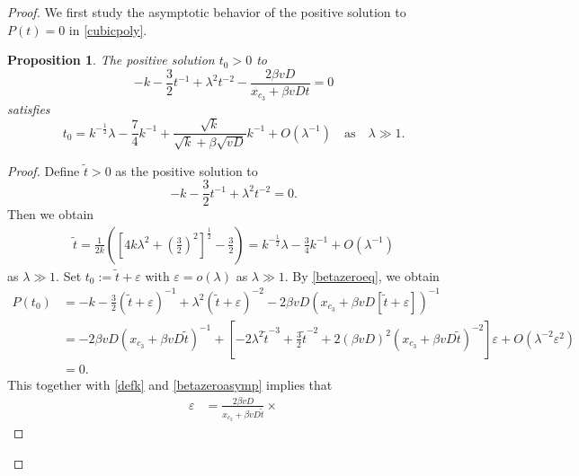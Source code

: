 \documentclass[10pt]{article}
\newtheorem{proposition}[theorem]{Proposition}
\numberwithin{equation}{section}
\numberwithin{figure}{section}
\begin{document}
\begin{proof}
We first study the asymptotic behavior of the positive solution to $P(t)=0$ in \eqref{cubicpoly}.
\begin{proposition}\label{ellzero}
The positive solution $t_0>0$ to 
\begin{equation}\label{betazeroeq}
- k  - \frac{3}{2} t^{-1} + \lambda^2 t^{-2} - \frac{2\beta v D}{x_{c_3} + \beta v D t} = 0
\end{equation}
satisfies   
\begin{equation}\label{ellzeroasymp}
t_0 =  k^{-\frac{1}{2}}\lambda - \frac{7}{4}k^{-1} + \frac{\sqrt{k}}{\sqrt{k}+\beta\sqrt{vD}}k^{-1}  + O\left(\lambda^{-1}\right) \quad \mbox{as} \quad \lambda \gg 1. 
\end{equation}
\end{proposition}
\begin{proof}
Define $\tilde{t}>0$ as the positive solution to
$$
-k  - \frac{3}{2} t^{-1} + \lambda^2 t^{-2} =0.
$$
Then we obtain
\begin{equation}\label{betazeroasymp}
\begin{split}
\tilde{t} = \frac{1}{2k} \left( \left[ 4k\lambda^2 + \left(\frac{3}{2}\right)^2 \right]^\frac{1}{2} - \frac{3}{2}  \right) 
= k^{-\frac{1}{2}}\lambda - \frac{3}{4}k^{-1} + O\left( \lambda^{-1} \right) 
\end{split}
\end{equation}
as $\lambda \gg 1$.
Set $t_0 := \tilde{t} + \varepsilon$ with $\varepsilon = o(\lambda)$ as $\lambda \gg 1$.
By \eqref{betazeroeq}, we obtain
\begin{equation}\label{P(t)expan}
\begin{split}
P(t_0) &= - k  - \frac{3}{2} \left(\tilde{t} + \varepsilon\right)^{-1} + \lambda^2 \left(\tilde{t} + \varepsilon\right)^{-2} 
- 2\beta v D  \left( x_{c_3} + \beta v D [\tilde{t} + \varepsilon]\right)^{-1} \\
 &=
 -2\beta v D \left( x_{c_3} + \beta v D \tilde{t} \right)^{-1}  + \left[ -2 \lambda^2 \tilde{t}^{-3} + \frac{3}{2}\tilde{t}^{-2} + 2(\beta v D)^2  \left( x_{c_3} + \beta v D \tilde{t} \right)^{-2}\right]\varepsilon +  O\left( \lambda^{-2}\varepsilon^2 \right) \\
  &= 0.
\end{split}
\end{equation}
This together with  \eqref{defk} and \eqref{betazeroasymp} implies that
\begin{equation}
\begin{split}
\varepsilon &= \frac{2\beta v D}{ x_{c_3} + \beta v D \tilde{t}} \times

\end{split}
\end{equation}
\end{proof}
\end{proof}
\end{document}
